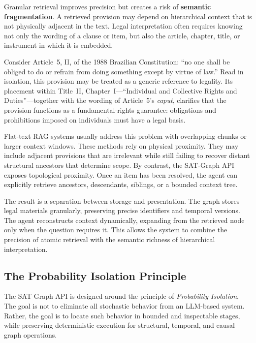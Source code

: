 \documentclass[11pt]{article}
\begin{document}
Granular retrieval improves precision but creates a risk of \textbf{semantic fragmentation}. A retrieved provision may depend on hierarchical context that is not physically adjacent in the text. Legal interpretation often requires knowing not only the wording of a clause or item, but also the article, chapter, title, or instrument in which it is embedded.

Consider Article~5, II, of the 1988 Brazilian Constitution: ``no one shall be obliged to do or refrain from doing something except by virtue of law.'' Read in isolation, this provision may be treated as a generic reference to legality. Its placement within Title~II, Chapter~I---``Individual and Collective Rights and Duties''---together with the wording of Article~5's \textit{caput}, clarifies that the provision functions as a fundamental-rights guarantee: obligations and prohibitions imposed on individuals must have a legal basis.

Flat-text RAG systems usually address this problem with overlapping chunks or larger context windows. These methods rely on physical proximity. They may include adjacent provisions that are irrelevant while still failing to recover distant structural ancestors that determine scope. By contrast, the SAT-Graph API exposes topological proximity. Once an item has been resolved, the agent can explicitly retrieve ancestors, descendants, siblings, or a bounded context tree.

The result is a separation between storage and presentation. The graph stores legal materials granularly, preserving precise identifiers and temporal versions. The agent reconstructs context dynamically, expanding from the retrieved node only when the question requires it. This allows the system to combine the precision of atomic retrieval with the semantic richness of hierarchical interpretation.

\subsection{The Probability Isolation Principle}
\label{subsec:probability_isolation}

The SAT-Graph API is designed around the principle of \textit{Probability Isolation}. The goal is not to eliminate all stochastic behavior from an LLM-based system. Rather, the goal is to locate such behavior in bounded and inspectable stages, while preserving deterministic execution for structural, temporal, and causal graph operations.
\end{document}
